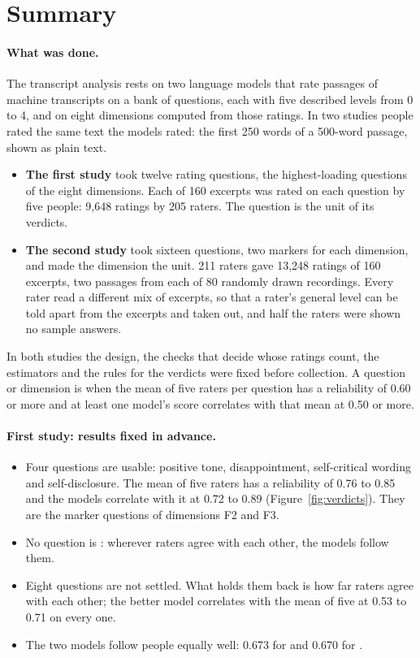 \section{Summary}\label{sec:summary}

\paragraph{What was done.}
The transcript analysis rests on two language models that rate passages of machine transcripts on a bank of
questions, each with five described levels from 0 to 4, and on eight dimensions computed from those ratings. In
two studies people rated the same text the models rated: the first 250 words of a 500-word passage, shown as
plain text.
\begin{itemize}
\item \textbf{The first study} took twelve rating questions, the highest-loading questions of the eight
  dimensions. Each of 160 excerpts was rated on each question by five people: 9{,}648 ratings by 205 raters. The
  question is the unit of its verdicts.
\item \textbf{The second study} took sixteen questions, two markers for each dimension, and made the dimension
  the unit. 211 raters gave 13{,}248 ratings of 160 excerpts, two passages from each of 80 randomly drawn
  recordings. Every rater read a different mix of excerpts, so that a rater's general level can be told apart
  from the excerpts and taken out, and half the raters were shown no sample answers.
\end{itemize}
In both studies the design, the checks that decide whose ratings count, the estimators and the rules for the
verdicts were fixed before collection. A question or dimension is  when the mean of five raters per
question has a reliability of 0.60 or more and at least one model's score correlates with that mean at 0.50 or
more.

\paragraph{First study: results fixed in advance.}
\begin{itemize}
\item Four questions are usable: positive tone, disappointment, self-critical wording and self-disclosure. The
  mean of five raters has a reliability of 0.76 to 0.85 and the models correlate with it at 0.72 to 0.89
  (Figure~\ref{fig:verdicts}). They are the marker questions of dimensions F2 and F3.
\item No question is : wherever raters agree with each other, the models follow them.
\item Eight questions are not settled. What holds them back is how far raters agree with each other; the better
  model correlates with the mean of five at 0.53 to 0.71 on every one.
\item The two models follow people equally well: 0.673 for \jev{} and 0.670 for \drex{}.
\end{itemize}

